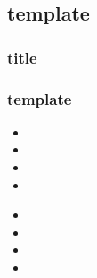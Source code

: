 \subsection{template}

\begin{frame}
  \frametitle{title}
\end{frame}

\begin{frame}
  \frametitle{template}

  
  \begin{itemize}
  \item 
  \item 
  \item 
  \item 
  \end{itemize}

  \begin{minipage}[l]{0.49\linewidth}
  \end{minipage}\hfill
  \begin{minipage}[l]{0.49\linewidth}
  \end{minipage}\hfill

  \begin{minipage}[l]{0.49\linewidth}
      \begin{itemize}
      \item 
      \item 
      \item 
      \item 
      \end{itemize}
  \end{minipage}\hfill
  \begin{minipage}[l]{0.49\linewidth}
  \end{minipage}\hfill

\end{frame}


